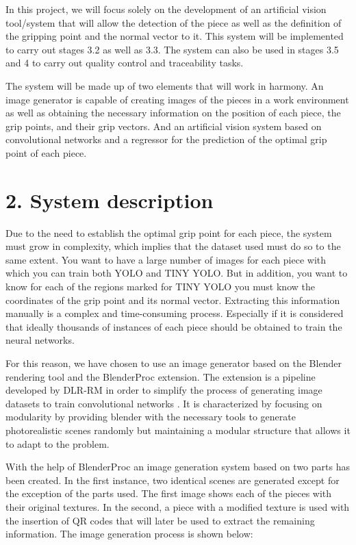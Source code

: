 {In this project, we will focus solely on the development of an artificial vision tool/system that will allow the detection of the piece as well as the definition of the gripping point and the normal vector to it. This system will be implemented to carry out stages 3.2 as well as 3.3. The system can also be used in stages 3.5 and 4 to carry out quality control and traceability tasks.

The system will be made up of two elements that will work in harmony. An image generator is capable of creating images of the pieces in a work environment as well as obtaining the necessary information on the position of each piece, the grip points, and their grip vectors. And an artificial vision system based on convolutional networks and a regressor for the prediction of the optimal grip point of each piece.

\section*{2. System description}
Due to the need to establish the optimal grip point for each piece, the system must grow in complexity, which implies that the dataset used must do so to the same extent. You want to have a large number of images for each piece with which you can train both YOLO and TINY YOLO. But in addition, you want to know for each of the regions marked for TINY YOLO you must know the coordinates of the grip point and its normal vector. Extracting this information manually is a complex and time-consuming process. Especially if it is considered that ideally thousands of instances of each piece should be obtained to train the neural networks.

For this reason, we have chosen to use an image generator based on the Blender rendering tool and the BlenderProc extension. The extension is a pipeline developed by DLR-RM in order to simplify the process of generating image datasets to train convolutional networks \citep{denninger2019blenderproc}. It is characterized by focusing on modularity by providing blender with the necessary tools to generate photorealistic scenes randomly but maintaining a modular structure that allows it to adapt to the problem.

With the help of BlenderProc an image generation system based on two parts has been created. In the first instance, two identical scenes are generated except for the exception of the parts used. The first image shows each of the pieces with their original textures. In the second, a piece with a modified texture is used with the insertion of QR codes that will later be used to extract the remaining information. The image generation process is shown below:

}
